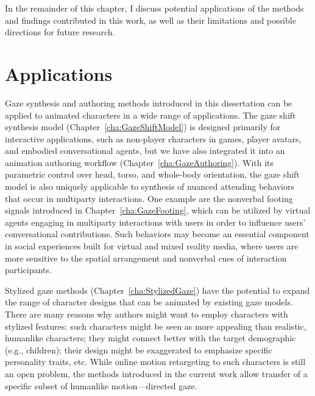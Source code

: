 In the remainder of this chapter, I discuss potential applications of the methods and findings contributed in this work, as well as their limitations and possible directions for future research.

\section{Applications}

Gaze synthesis and authoring methods introduced in this dissertation can be applied to animated characters in a wide range of applications. The gaze shift synthesis model (Chapter~\ref{cha:GazeShiftModel}) is designed primarily for interactive applications, such as non-player characters in games, player avatars, and embodied conversational agents, but we have also integrated it into an animation authoring workflow (Chapter~\ref{cha:GazeAuthoring}).
With its parametric control over head, torso, and whole-body orientation, the gaze shift model is also uniquely applicable to synthesis of nuanced attending behaviors that occur in multiparty interactions. One example are the nonverbal footing signals introduced in Chapter~\ref{cha:GazeFooting}, which can be utilized by virtual agents engaging in multiparty interactions with users in order to influence users' conversational contributions. Such behaviors may become an essential component in social experiences built for virtual and mixed reality media, where users are more sensitive to the spatial arrangement and nonverbal cues of interaction participants.

Stylized gaze methods (Chapter~\ref{cha:StylizedGaze}) have the potential to expand the range of character designs that can be animated by existing gaze models. There are many reasons why authors might want to employ characters with stylized features: such characters might be seen as more appealing than realistic, humanlike characters; they might connect better with the target demographic (e.g., children); their design might be exaggerated to emphasize specific personality traits, etc. While online motion retargeting to such characters is still an open problem, the methods introduced in the current work allow transfer of a specific subset of humanlike motion---directed gaze.

